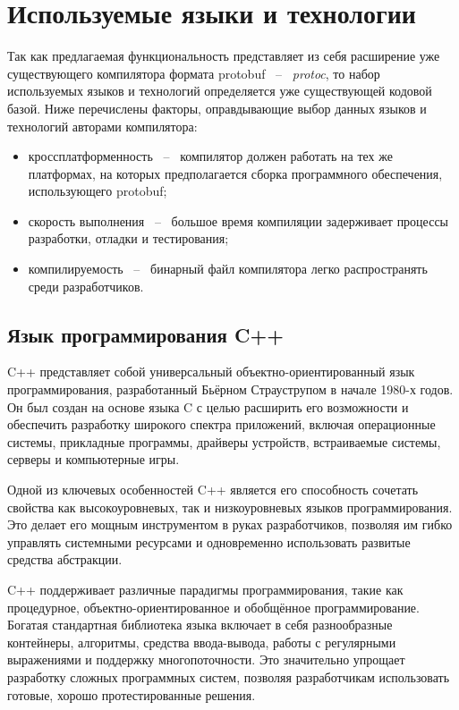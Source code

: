 \section{Используемые языки и технологии}

Так как предлагаемая функциональность представляет из себя расширение уже существующего компилятора формата protobuf ~--~ \textit{protoc}, то набор
используемых языков и технологий определяется уже существующей кодовой базой. Ниже перечислены факторы, оправдывающие выбор данных языков и технологий авторами компилятора:
\begin{itemize}
    \item кроссплатформенность ~--~ компилятор должен работать на тех же платформах, на которых предполагается сборка программного обеспечения, использующего protobuf;
    \item скорость выполнения ~--~ большое время компиляции задерживает процессы разработки, отладки и тестирования;
    \item компилируемость ~--~ бинарный файл компилятора легко распространять среди разработчиков.
\end{itemize}

\subsection{Язык программирования C++}

C++ представляет собой универсальный объектно-ориентированный язык программирования, разработанный Бьёрном Страуструпом в начале 1980-х годов. Он был создан на основе языка C с целью расширить его возможности и обеспечить разработку широкого спектра приложений, включая операционные системы, прикладные программы, драйверы устройств, встраиваемые системы, серверы и компьютерные игры.

Одной из ключевых особенностей C++ является его способность сочетать свойства как высокоуровневых, так и низкоуровневых языков программирования. Это делает его мощным инструментом в руках разработчиков, позволяя им гибко управлять системными ресурсами и одновременно использовать развитые средства абстракции.

C++ поддерживает различные парадигмы программирования, такие как процедурное, объектно-ориентированное и обобщённое программирование. Богатая стандартная библиотека языка включает в себя разнообразные контейнеры, алгоритмы, средства ввода-вывода, работы с регулярными выражениями и поддержку многопоточности. Это значительно упрощает разработку сложных программных систем, позволяя разработчикам использовать готовые, хорошо протестированные решения.

